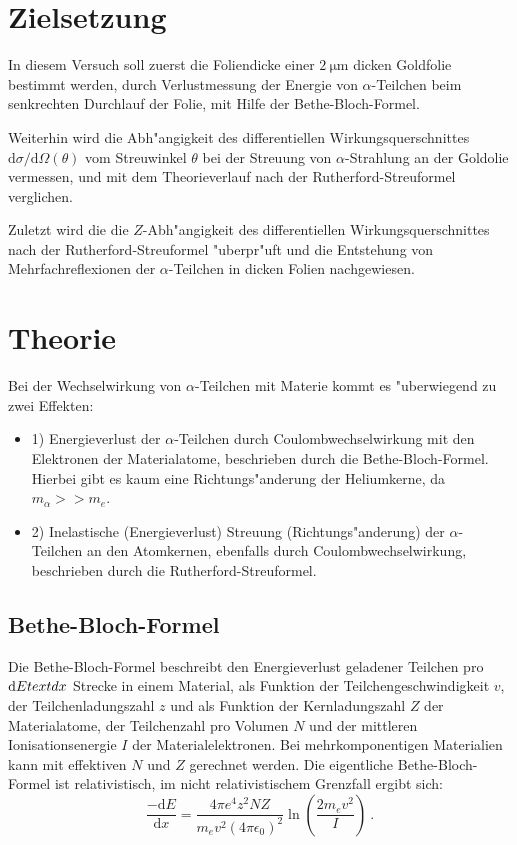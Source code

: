 \section{Zielsetzung}
  In diesem Versuch soll zuerst die Foliendicke einer $\SI{2}{\micro\meter}$ dicken Goldfolie bestimmt werden, durch Verlustmessung der Energie von $\alpha$-Teilchen beim senkrechten Durchlauf der Folie, mit Hilfe der Bethe-Bloch-Formel.

  Weiterhin wird die Abh"angigkeit des differentiellen Wirkungsquerschnittes $\text{d}\sigma/\text{d}\Omega(\theta)$ vom Streuwinkel $\theta$ bei der Streuung von $\alpha$-Strahlung an der Goldolie vermessen, und mit dem Theorieverlauf nach der Rutherford-Streuformel verglichen.

  Zuletzt wird die die $Z$-Abh"angigkeit des differentiellen Wirkungsquerschnittes nach der Rutherford-Streuformel "uberpr"uft und die Entstehung von Mehrfachreflexionen der $\alpha$-Teilchen in dicken Folien nachgewiesen.

\section{Theorie}
  \label{sec:Theorie}
  Bei der Wechselwirkung von $\alpha$-Teilchen mit Materie kommt es "uberwiegend zu zwei Effekten:
  \begin{itemize}
    \item 1) Energieverlust der $\alpha$-Teilchen durch Coulombwechselwirkung mit den Elektronen der Materialatome, beschrieben durch die Bethe-Bloch-Formel. Hierbei gibt es kaum eine Richtungs"anderung der Heliumkerne, da $m_{\alpha}>>m_e$.
    \item 2) Inelastische (Energieverlust) Streuung (Richtungs"anderung) der $\alpha$-Teilchen an den Atomkernen, ebenfalls durch Coulombwechselwirkung, beschrieben durch die Rutherford-Streuformel.
  \end{itemize}


  \subsection{Bethe-Bloch-Formel}
    Die Bethe-Bloch-Formel beschreibt den Energieverlust geladener Teilchen pro $\text{d}E\\text{d}x$ Strecke in einem Material, als Funktion der Teilchengeschwindigkeit $v$, der Teilchenladungszahl $z$ und als Funktion der Kernladungszahl $Z$ der Materialatome, der Teilchenzahl pro Volumen $N$ und der mittleren Ionisationsenergie $I$ der Materialelektronen.
    Bei mehrkomponentigen Materialien kann mit effektiven $N$ und $Z$ gerechnet werden.
    Die eigentliche Bethe-Bloch-Formel ist relativistisch, im nicht relativistischem Grenzfall ergibt sich:
    \begin{equation}
      \frac{-\text{d}E}{\text{d}x} = \frac{4\pi e^4z^2NZ}{m_ev^2(4\pi \epsilon_0)^2}\ln \left(\frac{2m_ev^2}{I}\right) \: .
    \end{equation}

